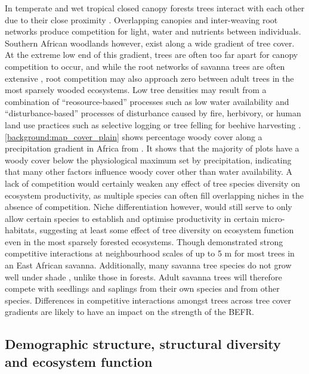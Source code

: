 \begin{refsection}
In temperate and wet tropical closed canopy forests trees interact with each other due to their close proximity \citep{Coomes2007a, Purves2007}. Overlapping canopies and inter-weaving root networks produce competition for light, water and nutrients between individuals. Southern African woodlands however, exist along a wide gradient of tree cover. At the extreme low end of this gradient, trees are often too far apart for canopy competition to occur, and while the root networks of savanna trees are often extensive \citep{Belsky1994}, root competition may also approach zero between adult trees in the most sparsely wooded ecosystems. Low tree densities may result from a combination of ``reosource-based'' processes such as low water availability and ``disturbance-based'' processes of disturbance caused by fire, herbivory, or human land use practices such as selective logging or tree felling for beehive harvesting \citep{Ryan2016}. \autoref{background:map_cover_plain} shows percentage woody cover along a precipitation gradient in Africa from \citet{Sankaran2005}. It shows that the majority of plots have a woody cover below the physiological maximum set by precipitation, indicating that many other factors influence woody cover other than water availability. A lack of competition would certainly weaken any effect of tree species diversity on ecosystem productivity, as multiple species can often fill overlapping niches in the absence of competition. Niche differentiation however, would still serve to only allow certain species to establish and optimise productivity in certain micro-habitats, suggesting at least some effect of tree diversity on ecosystem function even in the most sparsely forested ecosystems. Though \citet{Dohn2017} demonstrated strong competitive interactions at neighbourhood scales of up to 5 m for most trees in an East African savanna. Additionally, many savanna tree species do not grow well under shade \citep{Belsky1994}, unlike those in forests. Adult savanna trees will therefore compete with seedlings and saplings from their own species and from other species. Differences in competitive interactions amongst trees across tree cover gradients are likely to have an impact on the strength of the BEFR. 

\subsection{Demographic structure, structural diversity and ecosystem function}
\label{background:ssec:demography}


\end{refsection}
